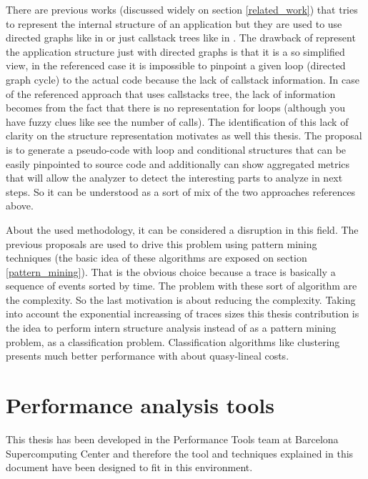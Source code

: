 There are previous works (discussed widely on section \ref{related_work})  that 
tries to represent the internal structure of an application but they are used to
use directed graphs like in \cite{aguilar2016event} or just callstack trees like
in \cite{saviankou2015cube}. The drawback of represent the application structure
just with directed graphs is that it is a so simplified view, in the referenced
case it is impossible to pinpoint a given loop (directed graph cycle) to the
actual code because the lack of callstack information. In case of the
referenced approach that uses callstacks tree, the lack of information becomes
from the fact that there is no representation for loops (although you have fuzzy
clues like see the number of calls). The identification of this lack of clarity
on the structure representation motivates as well this thesis. The proposal is to 
generate a pseudo-code with loop and conditional structures that can be easily 
pinpointed to source code and additionally can show aggregated metrics
that will allow the analyzer to detect the interesting parts to analyze in next
steps. So it can be understood as a sort of mix of the two approaches references
above.

About the used methodology, it can be considered a disruption in this field. The
previous proposals are used to drive this problem using pattern mining
techniques (the basic idea of these algorithms are exposed on section
\ref{pattern_mining}). That is the obvious choice because a trace is basically a
sequence of events sorted by time. The problem with these sort of algorithm are
the complexity. So the last motivation is about reducing the complexity. 
Taking into account the exponential increassing of traces sizes 
this thesis contribution is the idea to perform intern structure analysis 
instead of as a pattern mining problem, as a classification problem. 
Classification algorithms like clustering presents much better performance with 
about quasy-lineal costs.

\section{Performance analysis tools}\label{s:pt_evironment}

This thesis has been developed in the Performance Tools team at Barcelona
Supercomputing Center and therefore the tool and techniques explained in this
document have been designed to fit in this environment. 

